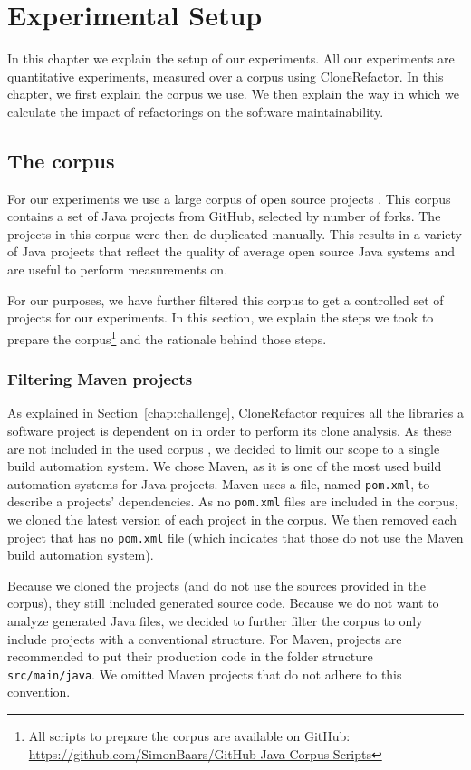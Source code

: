\chapter{Experimental Setup}
In this chapter we explain the setup of our experiments. All our experiments are quantitative experiments, measured over a corpus using CloneRefactor. In this chapter, we first explain the corpus we use. We then explain the way in which we calculate the impact of refactorings on the software maintainability.

\section{The corpus}\label{chap:corpus}
For our experiments we use a large corpus of open source projects \cite{githubCorpus2013}. This corpus contains a set of Java projects from GitHub, selected by number of forks. The projects in this corpus were then de-duplicated manually. This results in a variety of Java projects that reflect the quality of average open source Java systems and are useful to perform measurements on.

For our purposes, we have further filtered this corpus to get a controlled set of projects for our experiments. In this section, we explain the steps we took to prepare the corpus\footnote{All scripts to prepare the corpus are available on GitHub: \url{https://github.com/SimonBaars/GitHub-Java-Corpus-Scripts}} and the rationale behind those steps.

\subsection{Filtering Maven projects}
As explained in Section~\ref{chap:challenge}, CloneRefactor requires all the libraries a software project is dependent on in order to perform its clone analysis. As these are not included in the used corpus \cite{githubCorpus2013}, we decided to limit our scope to a single build automation system. We chose Maven, as it is one of the most used build automation systems for Java projects. Maven uses a file, named \texttt{pom.xml}, to describe a projects' dependencies. As no \texttt{pom.xml} files are included in the corpus, we cloned the latest version of each project in the corpus. We then removed each project that has no \texttt{pom.xml} file (which indicates that those do not use the Maven build automation system).

Because we cloned the projects (and do not use the sources provided in the corpus), they still included generated source code. Because we do not want to analyze generated Java files, we decided to further filter the corpus to only include projects with a conventional structure. For Maven, projects are recommended to put their production code in the folder structure \texttt{src/main/java}. We omitted Maven projects that do not adhere to this convention.

